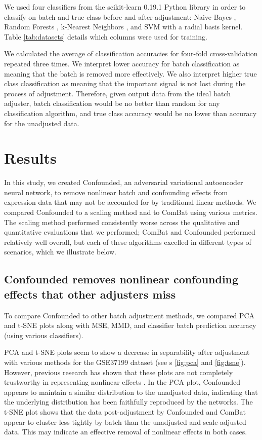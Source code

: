 \documentclass[12pt]{article}
\begin{document}
We used four classifiers from the scikit-learn 0.19.1 Python library \cite{pedregosa_scikit-learn_2011} in order to classify on batch and true class before and after adjustment: Naive Bayes \citep{maron_automatic_1961}, Random Forests \citep{tin_kam_ho_random_1995}, k-Nearest Neighbors \citep{fix_discriminatory_1951}, and SVM \citep{cortes_support-vector_1995} with a radial basis kernel.
Table \ref{tab:datasets} details which columns were used for training.

We calculated the average of classification accuracies for four-fold cross-validation repeated three times.
We interpret lower accuracy for batch classification as meaning that the batch is removed more effectively.
We also interpret higher true class classification as meaning that the important signal is not lost during the process of adjustment.
Therefore, given output data from the ideal batch adjuster, batch classification would be no better than random for any classification algorithm, and true class accuracy would be no lower than accuracy for the unadjusted data.

\section{Results} \label{sec:results}

In this study, we created Confounded, an adversarial variational autoencoder neural network, to remove nonlinear batch and confounding effects from expression data that may not be accounted for by traditional linear methods.
We compared Confounded to a scaling method and to ComBat \citep{johnson_adjusting_2007} using various metrics.
The scaling method performed consistently worse across the qualitative and quantitative evaluations that we performed;
ComBat and Confounded performed relatively well overall, but each of these algorithms excelled in different types of scenarios, which we illustrate below.

\subsection{Confounded removes nonlinear confounding effects that other adjusters miss}

To compare Confounded to other batch adjustment methods, we compared PCA and t-SNE plots along with MSE, MMD, and classifier batch prediction accuracy (using various classifiers).

PCA and t-SNE plots seem to show a decrease in separability after adjustment with various methods for the GSE37199 dataset (see \figurename{s} \ref{fig:pca} and \ref{fig:tsne}).
However, previous research has shown that these plots are not completely trustworthy in representing nonlinear effects \cite{dayton_classifying_2017-1}.
In the PCA plot, Confounded appears to maintain a similar distribution to the unadjusted data, indicating that the underlying distribution has been faithfully reproduced by the networks.
The t-SNE plot shows that the data post-adjustment by Confounded and ComBat appear to cluster less tightly by batch than the unadjusted and scale-adjusted data.
This may indicate an effective removal of nonlinear effects in both cases.
\end{document}
